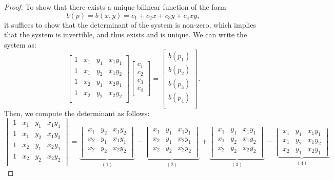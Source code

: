 \documentclass[12pt]{article}
\begin{document}
\begin{proof} To show that there exists a unique bilinear function of the form
$$b(p) = b(x,y) = c_1 + c_2x + c_3y + c_4xy,$$
it suffices to show that the determinant of the system is non-zero, which implies that the system is invertible, and thus exists and is unique.  We can write the system as:
$$\begin{bmatrix}
1 & x_1 & y_1 & x_1y_1 \\
1 & x_1 & y_2 & x_1y_2 \\
1 & x_2 & y_1 & x_2y_1 \\
1 & x_2 & y_2 & x_2y_2 \\
\end{bmatrix} \begin{bmatrix}
				c_1 \\
				c_2 \\
				c_3 \\
				c_4 \\
				\end{bmatrix} = \begin{bmatrix}
								b(p_1) \\
								b(p_2) \\
								b(p_3) \\
								b(p_4) \\
								\end{bmatrix}. $$
Then, we compute the determinant as follows:
$$\begin{vmatrix}
1 & x_1 & y_1 & x_1y_1 \\
1 & x_1 & y_2 & x_1y_2 \\
1 & x_2 & y_1 & x_2y_1 \\
1 & x_2 & y_2 & x_2y_2 \\
\end{vmatrix} = 
\underbrace{\begin{vmatrix}
x_1 & y_2 & x_1y_2 \\
x_2 & y_1 & x_1y_1 \\
x_2 & y_2 & x_2y_2 \\
\end{vmatrix}}_{(1)} - 
\underbrace{\begin{vmatrix}
x_1 & y_1 & x_1y_1 \\
x_2 & y_1 & x_2y_1 \\
x_2 & y_2 & x_2y_2 \\
\end{vmatrix}}_{(2)} +
\underbrace{\begin{vmatrix}
x_1 & y_1 & x_1y_1 \\
x_1 & y_2 & x_1y_2 \\
x_2 & y_2 & x_2y_2 \\
\end{vmatrix}}_{(3)} -
\underbrace{\begin{vmatrix}
x_1 & y_1 & x_1y_1 \\
x_1 & y_2 & x_1y_2 \\
x_2 & y_1 & x_2y_1
\end{vmatrix}}_{(4)}$$


\end{proof}
\end{document}
